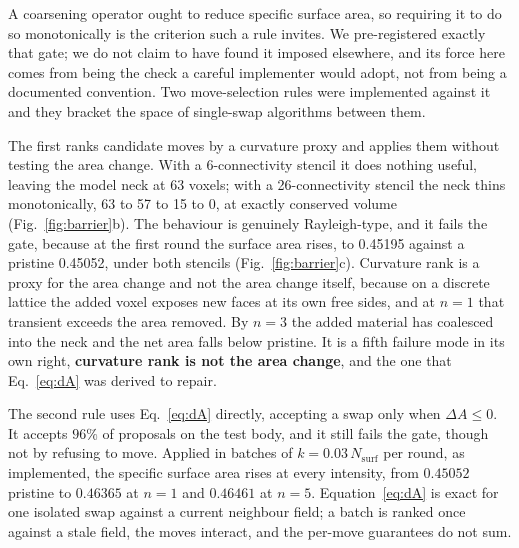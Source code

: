 \documentclass[5p,times,twocolumn]{elsarticle}
\begin{document}
A coarsening operator ought to reduce specific surface area, so requiring it
to do so monotonically is the criterion such a rule invites. We
pre-registered exactly that gate; we do not claim to have found it imposed
elsewhere, and its force here comes from being the check a careful
implementer would adopt, not from being a documented convention. Two move-selection rules were implemented against it and
they bracket the space of single-swap algorithms between them.

The first ranks candidate moves by a curvature proxy and applies them without
testing the area change. With a 6-connectivity stencil it does nothing useful,
leaving the model neck at 63 voxels; with a 26-connectivity stencil the neck
thins monotonically, 63 to 57 to 15 to 0, at exactly conserved volume
(Fig.~\ref{fig:barrier}b). The behaviour is genuinely Rayleigh-type, and it fails the gate, because at the first round the surface area rises, to
0.45195 against a pristine 0.45052, under both stencils
(Fig.~\ref{fig:barrier}c). Curvature rank is a proxy for the area change and
not the area change itself, because on a discrete lattice the added voxel
exposes new
faces at its own free sides, and at $n=1$ that transient exceeds the area
removed. By $n=3$ the added material has coalesced into the neck and the net
area falls below pristine. It is a fifth failure mode in its own right, \textbf{curvature rank is not the
area change}, and the one that
Eq.~\eqref{eq:dA} was derived to repair.

The second rule uses Eq.~\eqref{eq:dA} directly, accepting a swap only when
$\Delta A \leq 0$. It accepts $96\%$ of proposals on the test body, and it
still fails the gate, though not by refusing to move. Applied in batches of
$k = 0.03\,N_{\mathrm{surf}}$ per round, as implemented, the specific surface
area rises at every intensity, from $0.45052$ pristine to $0.46365$ at
$n=1$ and $0.46461$ at $n=5$. Equation~\eqref{eq:dA} is exact for one isolated
swap against a current neighbour field; a batch is ranked once against a stale
field, the moves interact, and the per-move guarantees do not sum.
\end{document}
